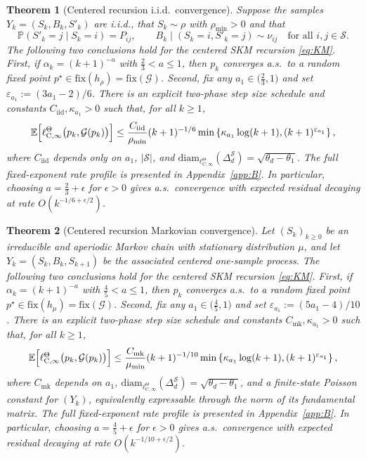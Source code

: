 \documentclass{article}
\newtheorem{theorem}{Theorem}
\newcommand{\X}{\mathcal{S}}
\newcommand{\E}{\mathbb{E}}
\begin{document}
\begin{theorem}[Centered recursion i.i.d.\ convergence]\label{thm:centered-iid}
Suppose the samples $Y_k = (S_k, B_k, S'_k)$ are i.i.d., that $S_k \sim \rho$ with $\rho_{\min} >0$ and that 
\begin{equation}
\mathbb P (S'_k = j \mid S_k = i) = P_{ij}, \qquad B_k \mid (S_k =i, S'_k=j) \sim \nu_{ij}\quad \text{for all } i, j \in \X.
\end{equation}
The following two conclusions hold for the centered SKM recursion \eqref{eq:KM}. First, if $\alpha_k = (k+1)^{-a}$ with $\frac{2}{3} < a \le 1$, then $p_k$ converges a.s.\ to a random fixed point $p^\star \in \mathrm{fix}(h_\rho) = \mathrm{fix}(\mathcal G)$. Second, fix any $a_1 \in \bigl(\frac{2}{3}, 1\bigr)$ and set $\varepsilon_{a_1} := (3a_1 -2)/6$. There is an explicit two-phase step size schedule and constants $C_\mathrm{iid}, \kappa_{a_1}>0$ such that, for all $k \ge 1$,
\begin{equation}
\E\Bigl[\ell^\Theta_{\mathrm C, \infty}\bigl(p_k, \mathcal G (p_k)\bigr) \Bigr] \le \frac{C_{\mathrm{iid}}}{\rho_{\min}} (k+1)^{-1/6} \min\left\{ \kappa_{a_1}\log(k+1), (k+1)^{\varepsilon_{a_1}}\right\},
\end{equation}
where $C_{\mathrm{iid}}$ depends only on $a_1$, $\lvert \X \rvert$, and $\mathrm{diam}_{\ell^\Theta_{\mathrm C,\infty}}(\Delta^\X_d) = \sqrt{\theta_d - \theta_1}$.
The full fixed-exponent rate profile is presented in Appendix~\ref{app:B}. In particular, choosing $a = \frac{2}{3} + \epsilon$ for $\epsilon >0$ gives a.s.\ convergence with expected residual decaying at rate $O(k^{-1/6+\epsilon/2})$.
\end{theorem}
\begin{theorem}[Centered recursion Markovian convergence]\label{thm:centered-markov}
Let $(S_k)_{k\ge 0}$ be an irreducible and aperiodic Markov chain with stationary distribution $\mu$, and let $Y_k = (S_k, B_k, S_{k+1})$ be the associated centered one-sample process. The following two conclusions hold for the centered SKM recursion \eqref{eq:KM}. First, if $\alpha_k = (k+1)^{-a}$ with $\frac{4}{5} < a \le 1$, then $p_k$ converges a.s.\ to a random fixed point $p^\star \in \mathrm{fix}(h_\mu)=\mathrm{fix}(\mathcal G)$. Second, fix any $a_1 \in \bigl(\frac{4}{5}, 1\bigr)$ and set $\varepsilon_{a_1}:=(5a_1-4)/10$. There is an explicit two-phase step size schedule and constants $C_{\mathrm{mk}}, \kappa_{a_1} >0$ such that, for all $k \ge 1$, 
\begin{equation}
\E\Bigl[\ell^\Theta_{\mathrm C, \infty}\bigl(p_k, \mathcal G (p_k)\bigr) \Bigr] \le \frac{C_{\mathrm{mk}}}{\mu_{\min}}(k+1)^{-1/10} \min \left\{\kappa_{a_1}\log(k+1), (k+1)^{\varepsilon_{a_1}} \right\},
\end{equation}
where $C_{\mathrm{mk}}$ depends on $a_1$, $\mathrm{diam}_{\ell^\Theta_{\mathrm C,\infty}}(\Delta^\X_d)=\sqrt{\theta_d - \theta_1}$, and a finite-state Poisson constant for $(Y_k)$, equivalently expressable through the norm of its fundamental matrix. The full fixed-exponent rate profile is presented in Appendix~\ref{app:B}. In particular, choosing $a = \frac{4}{5}+\epsilon$ for  $\epsilon >0$ gives a.s.\ convergence with expected residual decaying at rate $O(k^{-1/10+\epsilon/2})$.
\end{theorem}
\end{document}
